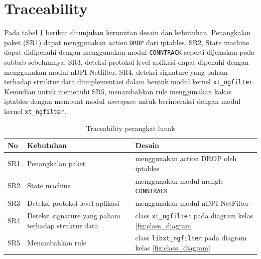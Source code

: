 \section{Traceability}

Pada tabel \ref{table:software_traceability_design} berikut ditunjukan kerunutan desain dan kebutuhan. Penangkalan paket (SR1) dapat menggunakan \textit{action} \verb|DROP| dari iptables. SR2, State machine dapat didipenuhi dengan menggunakan modul \verb|CONNTRACK| seperti dijelaskan pada subbab sebelumnya. SR3, deteksi protokol level aplikasi dapat dipenuhi dengan menggunakan modul nDPI-Netfilter. SR4, deteksi signature yang paham terhadap struktur data diimplementasi dalam bentuk modul kernel \verb|xt_ngfilter|. Kemudian untuk memenuhi SR5, menambahkan rule menggunakan kakas iptables dengan membuat modul \textit{userspace} untuk berinteraksi dengan modul kernel \verb|xt_ngfilter|.

\begin{table}[H]
	\caption{Traceability perangkat lunak}
	\label{table:software_traceability_design}
	\begin{tabularx}{\textwidth}{|l|X|X|}
		\hline
		\textbf{No} & \textbf{Kebutuhan} & \textbf{Desain} \\ \hline
		SR1 & Penangkalan paket & menggunakan action DROP oleh iptables \\ \hline 
		SR2 & State machine &  menggunakan modul mangle \verb|CONNTRACK| \\ \hline
		SR3 & Deteksi protokol level aplikasi & menggunakan modul nDPI-NetFilter \\ \hline
		SR4 & Deteksi signature yang paham terhadap struktur data& class \verb|xt_ngfilter| pada diagram kelas \ref{fig:class_diagram} \\ \hline
		SR5 & Menambahkan rule & class \verb|libxt_ngfilter| pada diagram kelas \ref{fig:class_diagram} \\ \hline
 	\end{tabularx}
\end{table}
